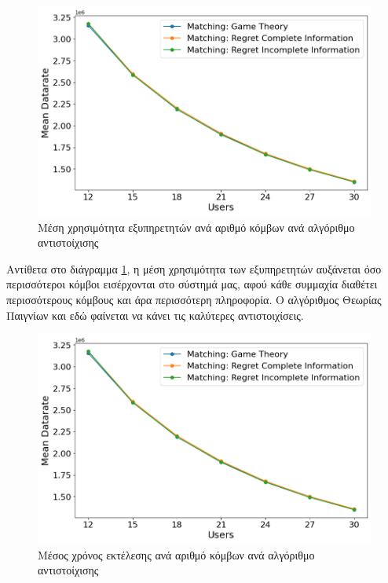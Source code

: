 \begin{figure}[H]
    \centering
    \includegraphics[width=\textwidth]{figures/chapter4/Mean_Datarate_vs_Users.png}
    \caption{Μέση χρησιμότητα εξυπηρετητών ανά αριθμό κόμβων ανά αλγόριθμο αντιστοίχισης}
    \label{fig10}
\end{figure}

\newpage

Αντίθετα στο διάγραμμα \ref{fig10}, η μέση χρησιμότητα των εξυπηρετητών αυξάνεται όσο περισσότεροι κόμβοι εισέρχονται στο σύστημά μας, αφού κάθε συμμαχία διαθέτει περισσότερους κόμβους και άρα περισσότερη πληροφορία. Ο αλγόριθμος Θεωρίας Παιγνίων και εδώ φαίνεται να κάνει τις καλύτερες αντιστοιχίσεις.

\begin{figure}[ht]
    \centering
    \includegraphics[width=\textwidth]{figures/chapter4/Mean_Datarate_vs_Users.png}
    \caption{Μέσος χρόνος εκτέλεσης ανά αριθμό κόμβων ανά αλγόριθμο αντιστοίχισης}
    \label{fig11}
\end{figure}

